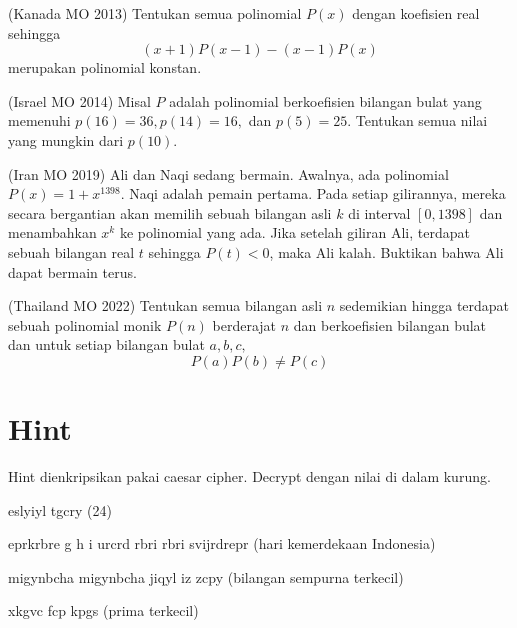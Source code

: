 \documentclass[11pt]{scrartcl}
\begin{document}
\begin{problem}
(Kanada MO 2013) Tentukan semua polinomial $P(x)$ dengan koefisien real sehingga \[(x + 1)P(x - 1) - (x - 1)P(x)\] merupakan polinomial konstan.
\end{problem}

\begin{problem}
(Israel MO 2014) Misal $P$ adalah polinomial berkoefisien bilangan bulat yang memenuhi $p(16) = 36, p(14) = 16, $ dan $p(5) = 25$. Tentukan semua nilai yang mungkin dari $p(10)$.
\end{problem}

\begin{problem}
(Iran MO 2019) Ali dan Naqi sedang bermain. Awalnya, ada polinomial $P(x) = 1 + x^{1398}$. Naqi adalah pemain pertama. Pada setiap gilirannya, mereka secara bergantian akan memilih sebuah bilangan asli $k$ di interval $[0, 1398]$ dan menambahkan $x^k$ ke polinomial yang ada. Jika setelah giliran Ali, terdapat sebuah bilangan real $t$ sehingga $P(t) < 0$, maka Ali kalah. Buktikan bahwa Ali dapat bermain terus.
\end{problem}

\begin{problem}
(Thailand MO 2022) Tentukan semua bilangan asli $n$ sedemikian hingga terdapat sebuah polinomial monik $P(n)$ berderajat $n$ dan berkoefisien bilangan bulat dan untuk setiap bilangan bulat $a, b, c,$ \[P(a)P(b) \neq P(c)\]
\end{problem}

\section{Hint}
Hint dienkripsikan pakai caesar cipher. Decrypt dengan nilai di dalam kurung.
\begin{problem}
eslyiyl tgcry (24)
\end{problem}

\begin{problem}
eprkrbre g h i urcrd rbri rbri svijrdrepr (hari kemerdekaan Indonesia)
\end{problem}

\begin{problem}
migynbcha migynbcha jiqyl iz zcpy (bilangan sempurna terkecil)
\end{problem}

\begin{problem}
xkgvc fcp kpgs (prima terkecil)
\end{problem}
\end{document}
